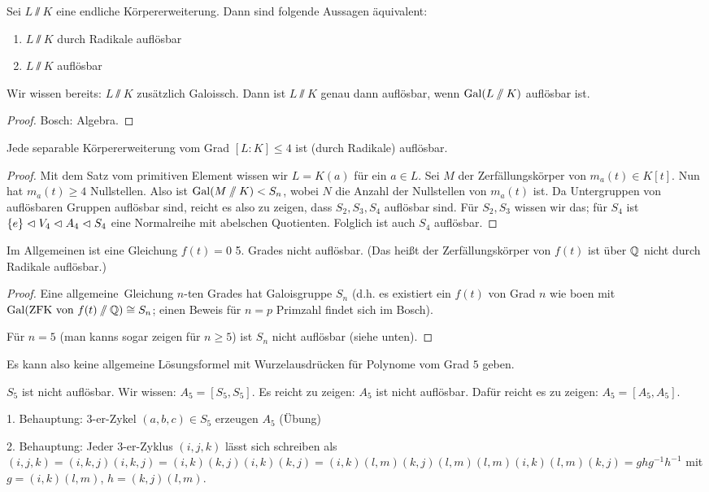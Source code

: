 \documentclass[12pt,a4paper]{scrartcl}
\begin{document}
\begin{satz}
	Sei $L\sslash K$ eine endliche Körpererweiterung. Dann sind folgende Aussagen äquivalent:
	\begin{enumerate}
		\item $L\sslash K$ durch Radikale auflösbar
		\item $L\sslash K$ auflösbar
	\end{enumerate}
	Wir wissen bereits: $L\sslash K$ zusätzlich Galoissch. Dann ist $L\sslash K$ genau dann auflösbar, wenn $\operatorname{Gal}(L\sslash K)$ auflösbar ist.
\end{satz}
\begin{proof} Bosch: Algebra.
\end{proof}
\begin{kor}
	Jede separable Körpererweiterung vom Grad $[L:K]\leq 4$ ist (durch Radikale) auflösbar.
\end{kor}
\begin{proof}
	Mit dem Satz vom primitiven Element wissen wir $L = K(a)$ für ein $a\in L$. Sei $M$ der Zerfällungskörper von $m_a(t)\in K[t]$. Nun hat $m_a(t)\geq 4$ Nullstellen. Also ist $\operatorname{Gal}(M\sslash K)<S_n$, wobei $N$ die Anzahl der Nullstellen von $m_a(t)$ ist. Da Untergruppen von auflösbaren Gruppen auflösbar sind, reicht es also zu zeigen, dass $S_2, S_3, S_4$ auflösbar sind. Für $S_2, S_3$ wissen wir das; für $S_4$ ist $\{e\}\vartriangleleft V_4\vartriangleleft A_4\vartriangleleft S_4$ eine Normalreihe mit abelschen Quotienten. Folglich ist auch $S_4$ auflösbar.
\end{proof}
\begin{satz}
	Im Allgemeinen ist eine Gleichung $f(t) = 0$ 5. Grades nicht auflösbar. (Das heißt der Zerfällungskörper von $f(t)$ ist über $\mathbb Q$ nicht durch Radikale auflösbar.)
\end{satz}
\begin{proof}
	Eine \glqq allgemeine\grqq\ Gleichung $n$-ten Grades hat Galoisgruppe $S_n$ (d.h. es existiert ein $f(t)$ von Grad $n$ wie boen mit $\operatorname{Gal}(\text{ZFK von }f(t)\sslash \mathbb Q)\cong S_n$; einen Beweis für $n =p$ Primzahl findet sich im Bosch). 
	
	Für $n = 5$ (man kanns sogar zeigen für $n\geq 5$) ist $S_n$ nicht auflösbar (siehe unten).
\end{proof}
Es kann also keine allgemeine Lösungsformel mit Wurzelausdrücken für Polynome vom Grad $5$ geben.

\begin{bem}
	$S_5$ ist nicht auflösbar. Wir wissen: $A_5 = [S_5, S_5]$. Es reicht zu zeigen: $A_5$ ist nicht auflösbar. Dafür reicht es zu zeigen: $A_5 = [A_5, A_5]$.
	
	1. Behauptung: 3-er-Zykel $(a,b,c)\in S_5$ erzeugen $A_5$ (Übung)
	
	2. Behauptung: Jeder $3$-er-Zyklus $(i,j,k)$ lässt sich schreiben als $(i,j,k)  = (i,k,j)(i,k,j) = (i,k)(k,j)(i,k)(k,j) = (i,k)(l,m)(k,j)(l,m)(l,m)(i,k)(l,m)(k,j) = ghg^{-1}h^{-1}$ mit $g = (i,k)(l,m)$, $h = (k,j)(l,m)$.
\end{bem}
\end{document}
